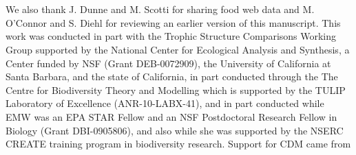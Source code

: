 \documentclass[12pt,a4paper,oneside]{article}
\begin{document}
\\
\newpage
{}\\
\noindent We also thank J. Dunne and M. Scotti for sharing
food web data and M. O'Connor and S. Diehl for reviewing an earlier version of this
manuscript. This work was conducted in part with the Trophic
Structure Comparisons Working Group supported by the National Center
for Ecological Analysis and Synthesis, a Center funded by NSF (Grant
DEB-0072909), the University of California at Santa Barbara, and the
state of California, in part conducted through the The Centre for Biodiversity Theory and Modelling which is supported by the TULIP Laboratory of Excellence (ANR-10-LABX-41), and in part conducted while EMW was an EPA STAR
Fellow and an NSF Postdoctoral Research Fellow in Biology (Grant DBI-0905806), and also while she was supported by the NSERC CREATE training program in biodiversity research. Support for CDM came from 
\end{document}

